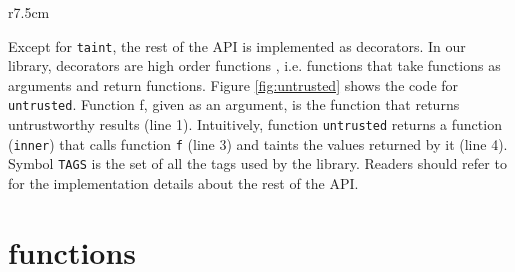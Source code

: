 \begin{wrapfigure}{r}{7.5cm}
\vspace{-30pt} 
{\small{

\caption{\label{fig:untrusted} Code for \texttt{untrusted}}
\vspace{-10pt}
}}
\vspace{-10pt}
\end{wrapfigure}
Except for \texttt{taint}, the rest of 
the API is implemented as decorators. In our library, 
decorators are high 
order functions \cite{IntroductionFunctional}, 
i.e. functions that take functions as arguments and return functions.
Figure \ref{fig:untrusted} shows the code for \texttt{untrusted}.
Function f, given as an argument, 
is the function that returns 
untrustworthy results (line 1). 
Intuitively, 
function \texttt{untrusted} returns
a function (\texttt{inner}) that 
calls function \texttt{f} (line 3) and taints the values 
returned by it (line 4). Symbol \texttt{TAGS} is the set of 
all the tags used by the library. 
Readers should refer to \cite{PythonLib} 
for the implementation details about the rest of the 
API.

\section{\nameTklass functions} 

